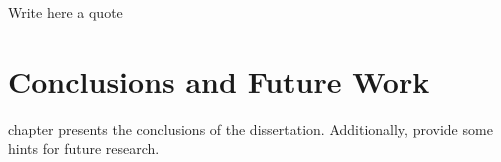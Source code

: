 

\begin{savequote}[50mm]
Write here a quote
\end{savequote}


\chapter{Conclusions and Future Work}
\label{cha:conclusions}

\ifpdf
    \graphicspath{{7_conclusions/figures/PDF/}{7_conclusions/figures/PNG/}{7_conclusions/figures/}}
\else
    \graphicspath{{7_conclusions/figures/EPS/}{7_conclusions/figures/}}
\fi

 chapter presents the conclusions of the dissertation. Additionally, provide some hints for future research.

